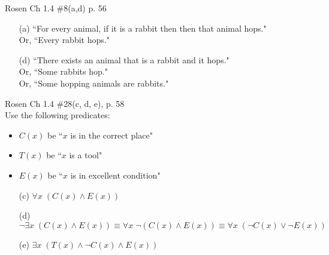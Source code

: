 \begin{questions}
 Rosen Ch 1.4 \#8(a,d)  p. 56
    \ifprintanswers
        \vspace{-12pt}
    \fi
  \begin{solution}
      \begin{itemize}[itemsep=0pt,parsep=0pt,topsep=0pt,partopsep=0pt]
         \item[(a)] ``For every animal, if it is a rabbit then then that animal hops."  \\Or, ``Every rabbit hops."
          \item[(d)] ``There exists an animal that is a rabbit and it hops." \\Or, ``Some rabbits hop." \\Or, ``Some hopping animals are rabbits."
      \end{itemize}
  \end{solution}




\label{probA} Rosen Ch 1.4 \#28(c, d, e), p. 58 \\
Use the following predicates:
\begin{itemize}[itemsep=0pt,parsep=0pt,topsep=0pt,partopsep=0pt]
    \item $C(x)$ be ``$x$ is in the correct place"
    \item $T(x)$ be ``$x$ is a tool"
    \item $E(x)$ be ``$x$ is in excellent condition"
\end{itemize}
    \ifprintanswers
        \vspace{-12pt}
    \fi
  \begin{solution}
      \begin{itemize}[itemsep=0pt,parsep=0pt,topsep=0pt,partopsep=0pt]
          \item[(c)] $\forall x\; (C(x) \wedge E(x)) $
          \item[(d)] $\neg \exists x\; (C(x) \wedge E(x)) \equiv \forall x\; \neg (C(x) \wedge E(x)) \equiv \forall x\; (\neg C(x) \vee \neg E(x))$
          \item[(e)] $\exists x\; (T(x) \wedge \neg C(x) \wedge E(x))$
      \end{itemize}
  \end{solution}




\end{questions}
